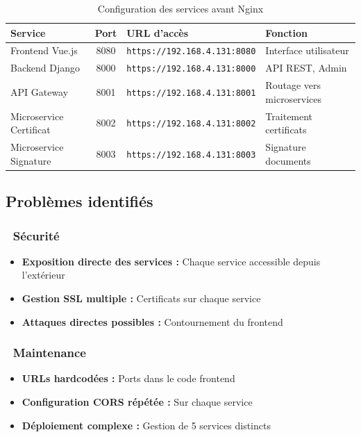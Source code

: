 \documentclass[12pt,a4paper]{article}
\begin{document}
\begin{table}[H]
\centering
\caption{Configuration des services avant Nginx}
\label{tab:services_initiaux}
\begin{tabularx}{\textwidth}{|l|c|X|X|}
\hline
\textbf{Service} & \textbf{Port} & \textbf{URL d'accès} & \textbf{Fonction} \\
\hline
Frontend Vue.js & 8080 & \texttt{https://192.168.4.131:8080} & Interface utilisateur \\
\hline
Backend Django & 8000 & \texttt{https://192.168.4.131:8000} & API REST, Admin \\
\hline
API Gateway & 8001 & \texttt{https://192.168.4.131:8001} & Routage vers microservices \\
\hline
Microservice Certificat & 8002 & \texttt{https://192.168.4.131:8002} & Traitement certificats \\
\hline
Microservice Signature & 8003 & \texttt{https://192.168.4.131:8003} & Signature documents \\
\hline
\end{tabularx}
\end{table}

\subsection{Problèmes identifiés}

\subsubsection{🔴 Sécurité}
\begin{itemize}[leftmargin=*]
    \item \textbf{Exposition directe des services :} Chaque service accessible depuis l'extérieur
    \item \textbf{Gestion SSL multiple :} Certificats sur chaque service
    \item \textbf{Attaques directes possibles :} Contournement du frontend
\end{itemize}

\subsubsection{🔴 Maintenance}
\begin{itemize}[leftmargin=*]
    \item \textbf{URLs hardcodées :} Ports dans le code frontend
    \item \textbf{Configuration CORS répétée :} Sur chaque service
    \item \textbf{Déploiement complexe :} Gestion de 5 services distincts
\end{itemize}
\end{document}
